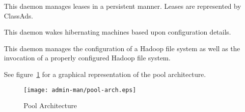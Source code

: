 \begin{description}
\item[\Condor{lease\_manager}] This daemon 
manages leases in a persistent manner.
Leases are represented by ClassAds.

\item[\Condor{rooster}] This daemon wakes hibernating machines based
upon configuration details.

\item[\Condor{hdfs}] This daemon manages the configuration of a
Hadoop file system as well as the invocation of a properly configured
Hadoop file system.


\end{description} 


See figure~\ref{fig:pool-arch} for a graphical representation of the
pool architecture. 

\begin{figure}[hbt]
\centering
\texttt{[image: admin-man/pool-arch.eps]}
\caption{\label{fig:pool-arch}Pool Architecture}
\end{figure}
